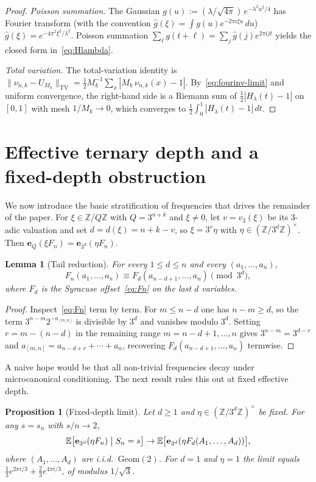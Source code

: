 \documentclass[11pt,a4paper]{amsart}
\theoremstyle{plain}
\newtheorem{proposition}[theorem]{Proposition}
\newtheorem{lemma}[theorem]{Lemma}
\theoremstyle{definition}
\newcommand{\Z}{\mathbb{Z}}
\newcommand{\E}{\mathbb{E}}
\newcommand{\TV}{\mathrm{TV}}
\newcommand{\Geom}{\mathrm{Geom}}
\begin{document}
\begin{proof}
\emph{Poisson summation.}
The Gaussian $g(u):=(\lambda/\sqrt{4\pi})\,e^{-\lambda^2 u^2/4}$ has Fourier
transform (with the convention $\widehat g(\xi)=\int g(u)e^{-2\pi i\xi u}\,du$)
$\widehat g(\xi)=e^{-4\pi^2\xi^2/\lambda^2}$.
Poisson summation $\sum_{\ell}g(t+\ell)=\sum_j\widehat g(j)e^{2\pi ijt}$
yields the closed form in~\eqref{eq:Hlambda}.

\emph{Total variation.}
The total-variation identity is
$\|\nu_{n,k}-U_{M_k}\|_{\TV}=\tfrac12 M_k^{-1}\sum_x|M_k\,\nu_{n,k}(x)-1|$.
By~\eqref{eq:fourinv-limit} and uniform convergence, the right-hand side is
a Riemann sum of $\tfrac12|H_\lambda(t)-1|$ on $[0,1]$ with mesh $1/M_k\to 0$,
which converges to $\tfrac12\int_0^1|H_\lambda(t)-1|\,dt$.
\end{proof}

\section{Effective ternary depth and a fixed-depth obstruction}\label{sec:depth}

We now introduce the basic stratification of frequencies that drives the
remainder of the paper.
For $\xi\in\Z/Q\Z$ with $Q=3^{n+k}$ and $\xi\ne0$, let $v=v_3(\xi)$ be its
$3$-adic valuation and set $d=d(\xi)=n+k-v$, so $\xi=3^v\eta$ with
$\eta\in(\Z/3^d\Z)^\times$.
Then $\mathbf e_Q(\xi F_n)=\mathbf e_{3^d}(\eta F_n)$.

\begin{lemma}[Tail reduction]\label{lem:tail}
For every $1\le d\le n$ and every $(a_1,\dots,a_n)$,
$$
F_n(a_1,\dots,a_n)\equiv F_d(a_{n-d+1},\dots,a_n)\pmod{3^d},
$$
where $F_d$ is the Syracuse offset~\eqref{eq:Fn} on the last $d$ variables.
\end{lemma}

\begin{proof}
Inspect~\eqref{eq:Fn} term by term.
For $m\le n-d$ one has $n-m\ge d$, so the term $3^{n-m}2^{-a_{[m,n]}}$ is
divisible by $3^d$ and vanishes modulo $3^d$.
Setting $r=m-(n-d)$ in the remaining range $m=n-d+1,\dots,n$ gives
$3^{n-m}=3^{d-r}$ and $a_{[m,n]}=a_{n-d+r}+\cdots+a_n$, recovering
$F_d(a_{n-d+1},\dots,a_n)$ termwise.
\end{proof}

A naive hope would be that all non-trivial frequencies decay under
microcanonical conditioning.
The next result rules this out at fixed effective depth.

\begin{proposition}[Fixed-depth limit]\label{prop:C}
Let $d\ge1$ and $\eta\in(\Z/3^d\Z)^\times$ be fixed.
For any $s=s_n$ with $s/n\to2$,
$$
\E\bigl[\mathbf e_{3^d}(\eta F_n)\bigm| S_n=s\bigr]
\to\E\bigl[\mathbf e_{3^d}(\eta F_d(A_1,\dots,A_d))\bigr],
$$
where $(A_1,\dots,A_d)$ are i.i.d.\ $\Geom(2)$.
For $d=1$ and $\eta=1$ the limit equals
$\tfrac13 e^{2\pi i/3}+\tfrac23 e^{4\pi i/3}$, of modulus $1/\sqrt 3$.
\end{proposition}
\end{document}
